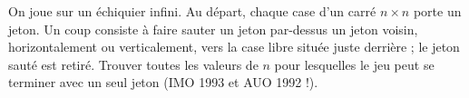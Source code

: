On joue sur un échiquier infini. Au départ, chaque case d'un carré $n \times n$ porte un jeton. Un coup consiste à faire sauter un jeton par-dessus un jeton voisin, horizontalement ou verticalement, vers la case libre située juste derrière ; le jeton sauté est retiré. Trouver toutes les valeurs de $n$ pour lesquelles le jeu peut se terminer avec un seul jeton (IMO 1993 et AUO 1992 !).
